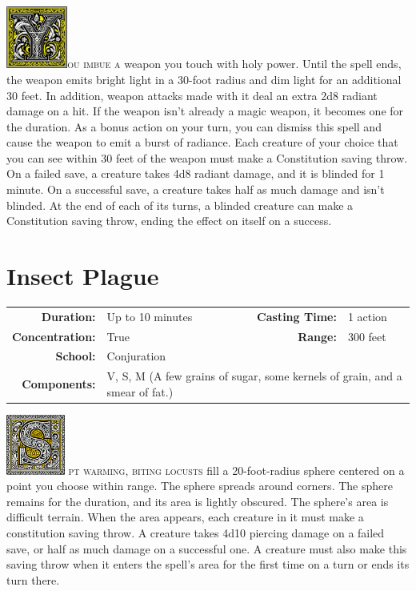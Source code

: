 \documentclass[12pt,showtrims]{memoir}
\begin{document}
\vspace{1\baselineskip}\noindent
\lettrine[lines=4]{\includegraphics[height=58pt]{initials/Y.png}}{ou imbue a} weapon you touch with holy power. Until the spell ends, the weapon emits bright light in a 30-foot radius and dim light for an additional 30 feet. In addition, weapon attacks made with it deal an extra 2d8 radiant damage on a hit. If the weapon isn’t already a magic weapon, it becomes one for the duration. As a bonus action on your turn, you can dismiss this spell and cause the weapon to emit a burst of radiance. Each creature of your choice that you can see within 30 feet of the weapon must make a Constitution saving throw. On a failed save, a creature takes 4d8 radiant damage, and it is blinded for 1 minute. On a successful save, a creature takes half as much damage and isn’t blinded. At the end of each of its turns, a blinded creature can make a Constitution saving throw, ending the effect on itself on a success.
\newpage


\section*{Insect Plague}

{
\small\centering\vspace{-6pt}
\begin{tabular}{rlrl}
\toprule

\textbf{Duration:} & Up to 10 minutes &
\textbf{Casting Time:} & 1 action \\
\textbf{Concentration:} & True &
\textbf{Range:} & 300 feet \\
\textbf{School:} & Conjuration \\
\textbf{Components:} & \multicolumn{3}{p{0.7\textwidth}}{V, S, M (A few grains of sugar, some kernels of grain, and a smear of fat.)}\\

\bottomrule
\end{tabular}
}

\vspace{1\baselineskip}\noindent
\lettrine[lines=4]{\includegraphics[height=56pt]{initials/S.png}}{ pt warming, biting locusts} fill a 20-foot-radius sphere centered on a point you choose within range. The sphere spreads around corners. The sphere remains for the duration, and its area is lightly obscured. The sphere's area is difficult terrain. When the area appears, each creature in it must make a constitution saving throw. A creature takes 4d10 piercing damage on a failed save, or half as much damage on a successful one. A creature must also make this saving throw when it enters the spell's area for the first time on a turn or ends its turn there.
\end{document}
